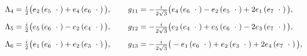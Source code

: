 \documentclass[letterpaper,12pt,titlepage,oneside,final]{book}
\begin{document}
\begin{equation}
\begin{array}{lll}
 \Lambda_4 = \frac{i}{2}\big(e_2\left(e_5\hspace{2mm} \cdot\hspace{1mm}\right)+e_4\left(e_6 \hspace{2mm}\cdot\hspace{1mm}\right) \big),  
 &\hspace{1mm}&  g_{11} =   -\frac{i}{2\sqrt{3}}\big(e_4\left(e_6\hspace{2mm} \cdot\hspace{1mm}\right)-e_2\left(e_5 \hspace{2mm}\cdot\hspace{1mm}\right)   +    2e_1\left(e_7 \hspace{2mm}\cdot\hspace{1mm}\right) \big),\vspace{3mm} \\


  
\Lambda_5 = \frac{i}{2}\big(e_5\left(e_6\hspace{2mm} \cdot\hspace{1mm}\right)-e_2\left(e_4 \hspace{2mm}\cdot\hspace{1mm}\right) \big),  &\hspace{1mm}&  g_{12} = -\frac{i}{2\sqrt{3}}\big(e_2\left(e_4\hspace{2mm} \cdot\hspace{1mm}\right)+e_5\left(e_6 \hspace{2mm}\cdot\hspace{1mm}\right)   -    2e_3\left(e_7 \hspace{2mm}\cdot\hspace{1mm}\right) \big), \vspace{3mm} \\


\Lambda_6 = \frac{i}{2}\big(e_1\left(e_6\hspace{2mm} \cdot\hspace{1mm}\right)+e_2\left(e_3 \hspace{2mm}\cdot\hspace{1mm}\right) \big),  &\hspace{1mm}& g_{13} =   -\frac{i}{2\sqrt{3}}\big(-e_1\left(e_6\hspace{2mm} \cdot\hspace{1mm}\right)+e_2\left(e_3 \hspace{2mm}\cdot\hspace{1mm}\right)   +   2e_4\left(e_7 \hspace{2mm}\cdot\hspace{1mm}\right) \big),\vspace{3mm} \\




\end{array}
\end{equation}
\end{document}
